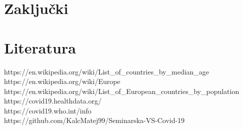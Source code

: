 \documentclass[a4paper,11pt]{article}
\begin{document}
\section{Zaključki}
\section{Literatura}
https://en.wikipedia.org/wiki/List_of_countries_by_median_age \\
https://en.wikipedia.org/wiki/Europe \\
https://en.wikipedia.org/wiki/List_of_European_countries_by_population \\
https://covid19.healthdata.org/ \\
https://covid19.who.int/info \\
https://github.com/KalcMatej99/Seminarska-VS-Covid-19 \\
\end{document}
